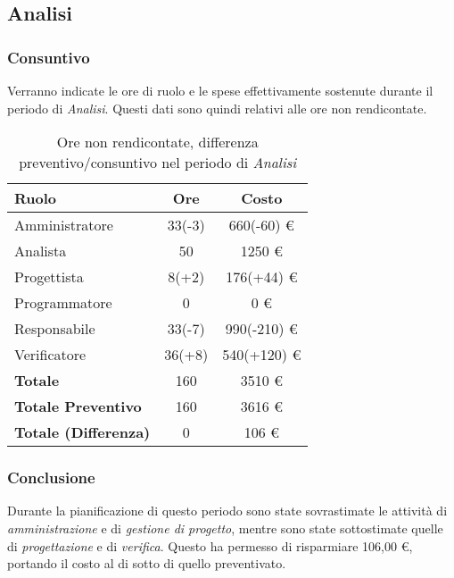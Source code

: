 \subsection{Analisi}
\subsubsection{Consuntivo}
Verranno indicate le ore di ruolo e le spese effettivamente sostenute durante il periodo di \textit{Analisi}. Questi dati sono quindi relativi alle ore non rendicontate.

\begin{table}[H]
	\centering
	\begin{tabular}{ l c c }
		\textbf{Ruolo} & \textbf{Ore} & \textbf{Costo} \\
		\hline
		Amministratore & 33(-3) & 660(-60) \euro{} \\
		Analista & 50 & 1250 \euro{} \\
		Progettista & 8(+2) & 176(+44) \euro{} \\
		Programmatore & 0 & 0 \euro{} \\
		Responsabile & 33(-7) & 990(-210) \euro{} \\
		Verificatore & 36(+8) & 540(+120) \euro{} \\
		\hline
		\textbf{Totale \glossaryItem{Consuntivo}} & 160 & 3510 \euro{} \\
		\hline
		\textbf{Totale Preventivo} & 160 & 3616 \euro{} \\
		\hline
		\textbf{Totale (Differenza)} & 0 & 106 \euro{} \\
		\hline
	\end{tabular}
	\caption{Ore non rendicontate, differenza preventivo/consuntivo nel periodo di \textit{Analisi}}
\end{table}



\subsubsection{Conclusione}
Durante la pianificazione di questo periodo sono state sovrastimate le attivit\`a di \textit{amministrazione} e di \textit{gestione di progetto}, mentre sono state sottostimate quelle di \textit{progettazione} e di \textit{verifica}.
Questo ha permesso di risparmiare 106,00 \euro{}, portando il costo  al di sotto di quello preventivato.
\newpage


